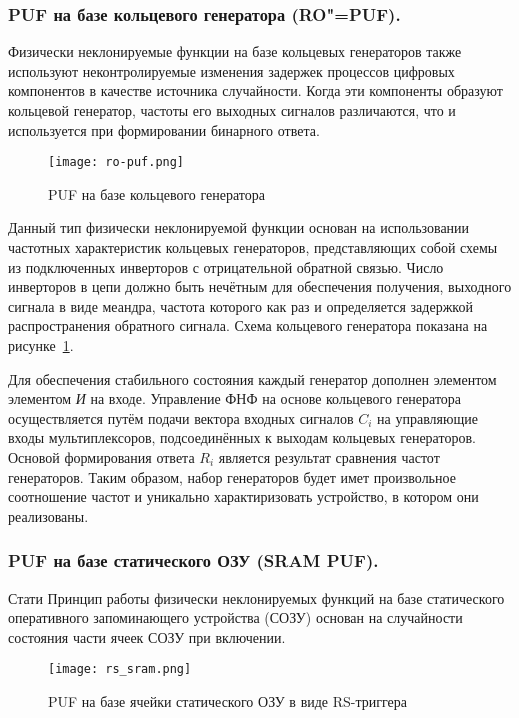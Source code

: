 \subsubsection{PUF на базе кольцевого генератора (RO"=PUF). }
\label{sub:domain:puf_types:ring_oscillator}

Физически неклонируемые функции на базе кольцевых генераторов также используют неконтролируемые изменения задержек процессов цифровых компонентов в качестве источника случайности. Когда эти компоненты образуют кольцевой генератор, частоты его выходных сигналов различаются, что и используется при формировании бинарного ответа.

\begin{figure}[ht]
    \centering
    \texttt{[image: ro-puf.png]}
    \caption{PUF на базе кольцевого генератора}
    \label{fig:domain:puf_types:ring_oscillator}
\end{figure}

Данный тип физически неклонируемой функции основан на использовании частотных характеристик кольцевых генераторов, представляющих собой схемы из подключенных инверторов с отрицательной обратной связью. Число инверторов в цепи должно быть нечётным для обеспечения получения, выходного сигнала в виде меандра, частота которого как раз и определяется задержкой распространения обратного сигнала. Схема кольцевого генератора показана на рисунке~\ref{fig:domain:puf_types:ring_oscillator}.

Для обеспечения стабильного состояния каждый генератор дополнен элементом элементом \emph{И} на входе. Управление ФНФ на основе кольцевого генератора осуществляется путём подачи вектора входных сигналов $C_i$ на управляющие входы мультиплексоров, подсоединённых к выходам кольцевых генераторов. Основой формирования ответа $R_i$ является результат сравнения частот генераторов. Таким образом, набор генераторов будет имет произвольное соотношение частот и уникально характиризовать устройство, в котором они реализованы.

\subsubsection{PUF на базе статического ОЗУ (SRAM PUF). }
\label{sub:domain:puf_types:sram}
Стати
Принцип работы физически неклонируемых функций на базе статического оперативного запоминающего устройства (СОЗУ) основан на случайности состояния части ячеек СОЗУ при включении.

\begin{figure}[ht]
    \centering
    \texttt{[image: rs\_sram.png]}
    \caption{PUF на базе ячейки статического ОЗУ в виде RS-триггера}
    \label{fig:domain:puf_types:sram}
\end{figure}

